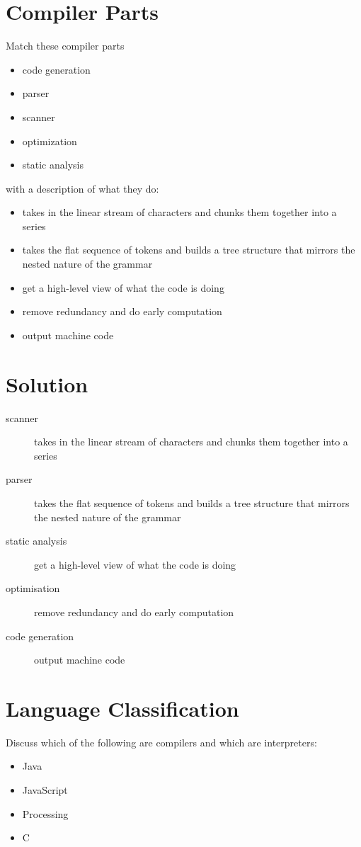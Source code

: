 \documentclass[twoside=false, DIV=14]{scrartcl}
\begin{document}
\section*{Compiler Parts}
\begin{minipage}[t]{0.4\textwidth}
Match these compiler parts 
\begin{itemize}
  \item code generation 
  \item parser 
  \item scanner
  \item optimization
  \item static analysis
\end{itemize}
\end{minipage}
\hspace{2em}
\begin{minipage}[t]{0.4\textwidth}
with a description of what they do:
\begin{itemize}
  \item takes in the linear stream of characters and chunks them together into a series
  \item takes the flat sequence of tokens and builds a tree structure that mirrors the nested nature of the grammar
  \item get a high-level view of what the code is doing
  \item remove redundancy and do early computation
  \item output machine code
\end{itemize}
\end{minipage}

\section*{Solution}
\begin{description}
  \item[scanner] takes in the linear stream of characters and chunks them together into a series
  \item[parser] takes the flat sequence of tokens and builds a tree structure that mirrors the nested nature of the grammar
  \item[static analysis] get a high-level view of what the code is doing
  \item[optimisation] remove redundancy and do early computation
  \item[code generation] output machine code
\end{description}
\section*{Language Classification}
  Discuss which of the following are compilers and which are interpreters:
  \begin{itemize}
    \renewcommand{\labelitemi}{$\square$}
    \item Java
    \item JavaScript
    \item Processing
    \item C
  \end{itemize}
  
\end{document}
